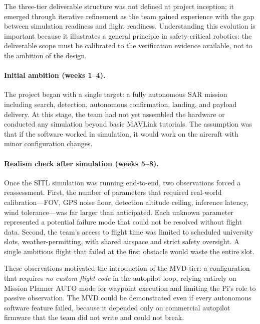 The three-tier deliverable structure was not defined at project inception; it emerged through iterative refinement as the team gained experience with the gap between simulation readiness and flight readiness.  Understanding this evolution is important because it illustrates a general principle in safety-critical robotics: the deliverable scope must be calibrated to the verification evidence available, not to the ambition of the design.

\paragraph{Initial ambition (weeks 1--4).}
The project began with a single target: a fully autonomous SAR mission including search, detection, autonomous confirmation, landing, and payload delivery.  At this stage, the team had not yet assembled the hardware or conducted any simulation beyond basic MAVLink tutorials.  The assumption was that if the software worked in simulation, it would work on the aircraft with minor configuration changes.

\paragraph{Realism check after simulation (weeks 5--8).}
Once the SITL simulation was running end-to-end, two observations forced a reassessment.  First, the number of parameters that required real-world calibration---FOV, GPS noise floor, detection altitude ceiling, inference latency, wind tolerance---was far larger than anticipated.  Each unknown parameter represented a potential failure mode that could not be resolved without flight data.  Second, the team's access to flight time was limited to scheduled university slots, weather-permitting, with shared airspace and strict safety oversight.  A single ambitious flight that failed at the first obstacle would waste the entire slot.

These observations motivated the introduction of the MVD tier: a configuration that requires \emph{no custom flight code} in the autopilot loop, relying entirely on Mission Planner AUTO mode for waypoint execution and limiting the Pi's role to passive observation.  The MVD could be demonstrated even if every autonomous software feature failed, because it depended only on commercial autopilot firmware that the team did not write and could not break.

